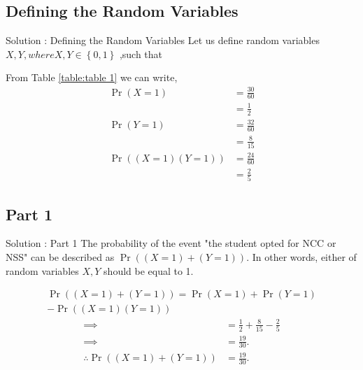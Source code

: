 \documentclass{beamer}
\providecommand{\pr}[1]{\ensuremath{\Pr\left(#1\right)}}
\providecommand{\brak}[1]{\ensuremath{\left(#1\right)}}
\providecommand{\cbrak}[1]{\ensuremath{\left\{#1\right\}}}
\begin{document}
\subsection{Defining the Random Variables}
\begin{frame}{ Solution : Defining the Random Variables}
  Let us define random variables $X,Y, where X,Y \in  \cbrak{0,1}$ ,such that
       \begin{table}[ht!]
        
        \caption{}
        \label{table:table 2}
       \end{table}
\end{frame}
   From Table \ref{table:table 1} we can write,
          \begin{align}
               \pr{X = 1} &= \frac{30}{60} \\
                          &=\frac{1}{2}\\
               \pr{Y = 1} &= \frac{32}{60} \\
                          &= \frac{8}{15}\label{eq:4}\\
               \pr{\brak{X = 1}\brak{Y=1}} &= \frac{24}{60}\\
                                           &= \frac{2}{5}\label{eq:6}
          \end{align}
\subsection{Part 1}
     
\begin{frame}{Solution : Part 1}
      The probability of the event "the student opted for NCC or NSS" can be described as $\pr{\brak{X = 1} + \brak{Y = 1}}$. In other words, either of random variables $X,Y$ should be equal to 1.
                  
          \begin{equation}
            \begin{split}
                \pr{\brak{X = 1} + \brak{Y = 1}} = \pr{X=1}+\pr{Y=1}\\
                                                       -\pr{\brak{X = 1}\brak{Y=1}}
            \end{split}
          \end{equation}
          \begin{align}
             \implies      &= \frac{1}{2} + \frac{8}{15}  - \frac{2}{5}\\
             \implies      &= \frac{19}{30}.\\
             \therefore \pr{\brak{X = 1} + \brak{Y = 1}} &= \frac{19}{30}.\label{eq:10}
          \end{align}
\end{frame} 
\end{document}

